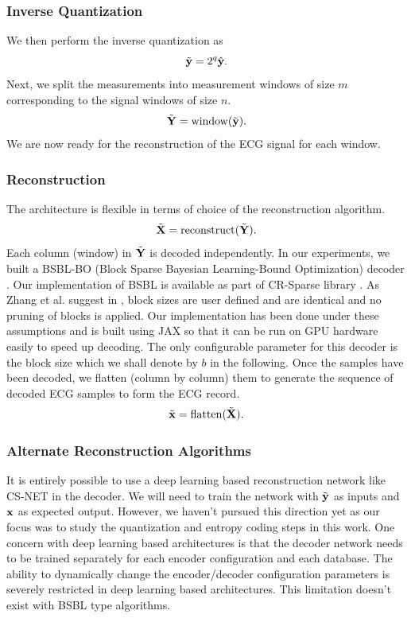 \subsubsection{Inverse Quantization}
We then perform the inverse quantization as
\begin{equation}
\tilde{\mathbf{y}} = 2^q \hat{\mathbf{y}}.
\end{equation}
Next, we split the measurements into measurement windows of size $m$
corresponding to the signal windows of size $n$.
\begin{equation}
\tilde{\mathbf{Y}} = \mathrm{window}(\tilde{\mathbf{y}}).
\end{equation}
We are now ready for the reconstruction of the ECG signal for each window.
\subsubsection{Reconstruction}
The architecture is flexible in terms of choice of the
reconstruction algorithm.
\begin{equation}
\tilde{\mathbf{X}} = \mathrm{reconstruct}(\tilde{\mathbf{Y}}).
\end{equation}
Each column (window) in $\tilde{\mathbf{Y}}$ is decoded independently.
In our experiments, we built
a BSBL-BO (Block Sparse Bayesian Learning-Bound Optimization)
decoder \cite{zhang2013extension,zhang2012compressed,zhang2016comparison}.
Our implementation of BSBL is available as part of CR-Sparse library
\cite{kumar2021cr}. As Zhang et al. suggest in \cite{zhang2012compressed},
block sizes are user defined and are identical and
no pruning of blocks is applied. Our implementation has been
done under these assumptions and is built using JAX so that it can
be run on GPU hardware easily to speed up decoding.
The only configurable parameter for this decoder is the block size
which we shall denote by $b$ in the following.
Once the samples have been decoded,
we flatten (column by column) them to generate
the sequence of decoded ECG samples to form the ECG record.
\begin{equation}
\tilde{\mathbf{x}} = \mathrm{flatten}(\tilde{\mathbf{X}}).
\end{equation}

\subsubsection{Alternate Reconstruction Algorithms}
It is entirely possible to use a deep learning based
reconstruction network like CS-NET \cite{zhang2021csnet}
in the decoder. We will need to train the network with
$\tilde{\mathbf{y}}$ as inputs and $\mathbf{x}$ as expected output.
However, we haven't pursued this direction yet as our
focus was to study the quantization and entropy coding
steps in this work. One concern with deep learning
based architectures is that the decoder network
needs to be trained separately for each encoder
configuration and each database. The ability
to dynamically change the encoder/decoder
configuration parameters is severely restricted
in deep learning based architectures.
This limitation doesn't exist with BSBL type
algorithms.

